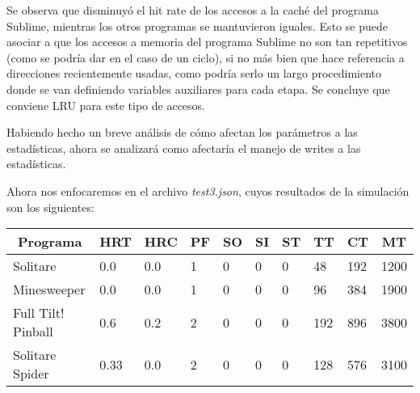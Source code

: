 \documentclass{article}
\begin{document}
Se observa que disminuyó el hit rate de los accesos a la caché del programa Sublime, mientras los otros programas se mantuvieron iguales. Esto se puede asociar a que los accesos a memoria del programa Sublime no son tan repetitivos (como se podría dar en el caso de un ciclo), si no más bien que hace referencia a direcciones recientemente usadas, como podría serlo un largo procedimiento donde se van definiendo variables auxiliares para cada etapa. Se concluye que conviene LRU para este tipo de accesos.

Habiendo hecho un breve análisis de cómo afectan los parámetros a las estadísticas, ahora se analizará como afectaría el manejo de writes a las estadísticas.

Ahora nos enfocaremos en el archivo \textit{test3.json}, cuyos resultados de la simulación son los siguientes:

\begin{table}[H]
\begin{tabular}{|l|l|l|l|l|l|l|l|l|l|}
\hline
\multicolumn{1}{|c|}{\textbf{Programa}} & \multicolumn{1}{c|}{\textbf{HRT}} & \multicolumn{1}{c|}{\textbf{HRC}} & \multicolumn{1}{c|}{\textbf{PF}} & \multicolumn{1}{c|}{\textbf{SO}} & \multicolumn{1}{c|}{\textbf{SI}} & \multicolumn{1}{c|}{\textbf{ST}} & \multicolumn{1}{c|}{\textbf{TT}} & \multicolumn{1}{c|}{\textbf{CT}} & \multicolumn{1}{c|}{\textbf{MT}} \\ \hline
Solitare                                & 0.0                               & 0.0                               & 1                                & 0                                & 0                                & 0                                & 48                               & 192                              & 1200                             \\ \hline
Minesweeper                             & 0.0                               & 0.0                               & 1                                & 0                                & 0                                & 0                                & 96                               & 384                              & 1900                             \\ \hline
Full Tilt! Pinball                      & 0.6                               & 0.2                               & 2                                & 0                                & 0                                & 0                                & 192                              & 896                              & 3800                             \\ \hline
Solitare Spider                         & 0.33                              & 0.0                               & 2                                & 0                                & 0                                & 0                                & 128                              & 576                              & 3100                             \\ \hline
\end{tabular}
\end{table}
\end{document}
